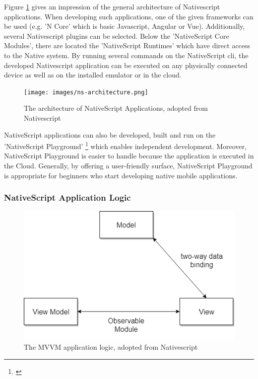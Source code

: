 Figure \ref{nsarchitecture} gives an impression of the general architecture of Nativescript applications. When developing such applications, one of the given frameworks can be used (e.g. 'N Core' which is basic Javascript, Angular or Vue). Additionally, several Nativescript plugins can be selected. Below the 'NativeScript Core Modules', there are located the 'NativeScript Runtimes' which have direct access to the Native system. By running several commands on the NativeScript \ac{cli}, the developed Nativescript application can be executed on any physically connected device as well as on the installed emulator or in the cloud. 

\begin{figure}[h!]
	\centering
	\texttt{[image: images/ns-architecture.png]}
	\caption{The architecture of NativeScript Applications, adopted from Nativescript}
	\label{nsarchitecture}
\end{figure}

NativeScript applications can also be developed, built and run on the 'NativeScript Playground' \footnote{\cite{nsplayground}} which enables independent development. Moreover, NativeScript Playground is easier to handle because the application is executed in the Cloud. Generally, by offering a user-friendly surface, NativeScript Playground is appropriate for beginners who start developing native mobile applications.

\subsubsection{NativeScript Application Logic}

\begin{figure}[h!]
	\centering
	\includegraphics[width=1\textwidth]{images/mvvm_ns.png}
	\caption{The MVVM application logic, adopted from Nativescript}
	\label{mvvm}
\end{figure}

